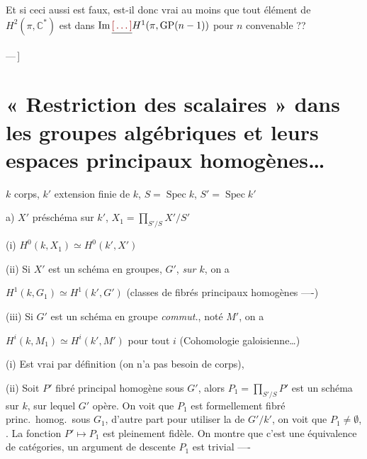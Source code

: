 \documentclass[11pt,a4paper]{article}
\begin{document}

Et si ceci aussi est faux, est-il donc vrai au moins que tout élément de
$H^2(\pi, \mathbb{C}^{*})$ est dans $\operatorname{Im} \struck{\ill{}} H^1(\pi,
\mathrm{GP}(n-1))$ pour $n$ convenable ??

---\,]

\section*{« Restriction des scalaires » dans les groupes algébriques et leurs espaces principaux homogènes\ldots}



$k$ corps, $k'$ extension finie de $k$, $S = \operatorname{Spec} k$,
$S' = \operatorname{Spec} k'$


a) $X'$ préschéma sur $k'$, $X_1 = \prod_{S'/S} X'/S'$

(i) \quad $\boxed{H^0(k, X_1) \simeq H^0(k', X')}$

(ii) \quad Si $X'$ est un schéma en groupes,  $G'$,
\emph{ sur $k$}, on a

\quad $\boxed{H^1(k, G_1) \simeq H^1(k', G')}$ \quad (classes de fibrés
principaux homogènes ----)

(iii) \quad Si $G'$ est un schéma en groupe \emph{commut.}, noté $M'$, on a

\quad $\boxed{H^i(k, M_1) \simeq H^i(k', M')}$ \quad pour tout $i$
\quad (Cohomologie galoisienne\ldots)

(i) Est vrai par définition (on n'a pas besoin de corps),

(ii) Soit $P'$ fibré principal homogène sous $G'$, alors
$P_1 = \prod_{S'/S} P'$ est un schéma sur $k$, sur lequel $G'$ opère. On voit
que $P_1$ est formellement fibré princ.\ homog.\ sous $G_1$, d'autre part
 pour utiliser la  de
$G'/k'$, on voit que $P_1 \neq \emptyset$, . La fonction $P' \mapsto P_1$ est pleinement fidèle.
On montre que c'est une équivalence de catégories, un argument de descente
 $P_1$ est trivial ----
\end{document}
